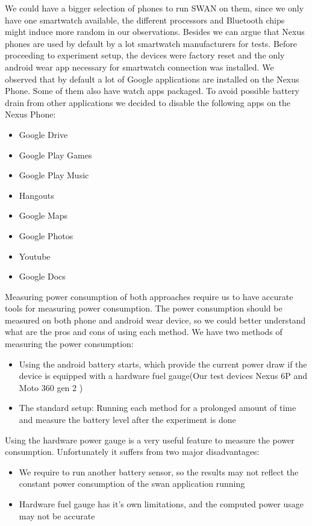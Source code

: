  We could have a bigger selection of phones to run SWAN on them, since we only have one smartwatch available,
 the different processors  and Bluetooth chips might induce more random in our observations.
 Besides we can argue that Nexus phones are used by default by a lot smartwatch manufacturers for tests.
 Before proceeding to experiment setup, the devices were factory reset and the only android wear app necessary for smartwatch connection was installed.
 We observed that by default a lot of Google applications are installed on the Nexus Phone. Some of them also have watch apps packaged.
 To avoid possible battery drain from other applications we decided to disable the following apps on the Nexus Phone:
 \begin{itemize}
  \item  Google Drive
  \item Google Play Games
  \item Google Play Music
  \item Hangouts
  \item Google Maps
  \item Google Photos
  \item Youtube
  \item Google Docs
 \end{itemize}

 Measuring power consumption of both approaches require us to have accurate tools for measuring power consumption.
 The power consumption should be measured on both phone and android wear device, so we could better understand what are the pros and cons of using each method.
 We have two methods of measuring the power consumption:
 \begin{itemize}
  \item Using the android battery starts, which provide the current power draw if the device is equipped with a hardware fuel gauge(Our test devices Nexus 6P and Moto 360 gen 2 )\cite{fuel_gauge}
  \item The standard setup: Running each method for a prolonged amount of time and measure the battery level after the experiment is done
 \end{itemize}

 Using the hardware power gauge is a very useful feature to measure the power consumption. Unfortunately it suffers from two major disadvantages:
 \begin{itemize}
  \item We require to run another battery sensor, so the results may not reflect the constant power consumption of the swan application running
  \item Hardware fuel gauge has it's own limitations, and the computed power usage may not be accurate
 \end{itemize}

